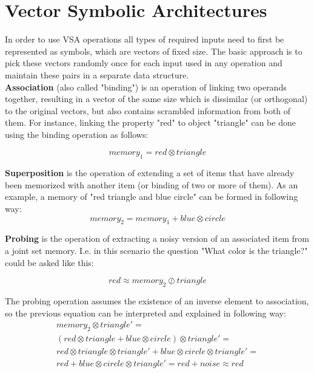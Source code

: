 \documentclass[conference]{IEEEtran}
\begin{document}
	\section{Vector Symbolic Architectures}
	
In order to use VSA operations all types of required inputs need to first be represented as symbols, which are vectors of fixed size. The basic approach is to pick these vectors randomly once for each input used in any operation and maintain these pairs in a separate data structure.	
	\\
	
	\textbf{Association} (also called "binding") is an operation of linking two operands together, resulting in a vector of the same size which is dissimilar (or orthogonal) to the original vectors, but also contains scrambled information from both of them.
For instance, linking the property "red" to object "triangle" can be done using the binding operation as follows:
	
	\begin{equation}
	memory_1 = red \otimes triangle
	\end{equation}
	
	\textbf{Superposition} is the operation of extending a set of items that have already been memorized with another item (or binding of two or more of them).
As an example, a memory of "red triangle and blue circle" can be formed in following way:
	\begin{equation}
	memory_2 = memory_1 + blue \otimes circle
	\end{equation}
	
	\textbf{Probing} is the operation of extracting a noisy version of an associated item from a joint set memory.
I.e. in this scenario the question "What color is the triangle?" could be asked like this:
	
	\begin{equation}
	red \approx memory_2 \oslash triangle
	\end{equation}
	
	
	The probing operation assumes the existence of an inverse element to association, so the previous equation can be interpreted and explained in following way:
	\begin{multline}
	memory_2 \otimes triangle'=\\
	(red \otimes triangle + blue \otimes circle) \otimes triangle'=\\
	red \otimes triangle  \otimes triangle' + blue \otimes circle \otimes triangle' =\\
	red + blue \otimes circle \otimes triangle'  = red + noise
	\approx red
	\end{multline}
	
\end{document}
